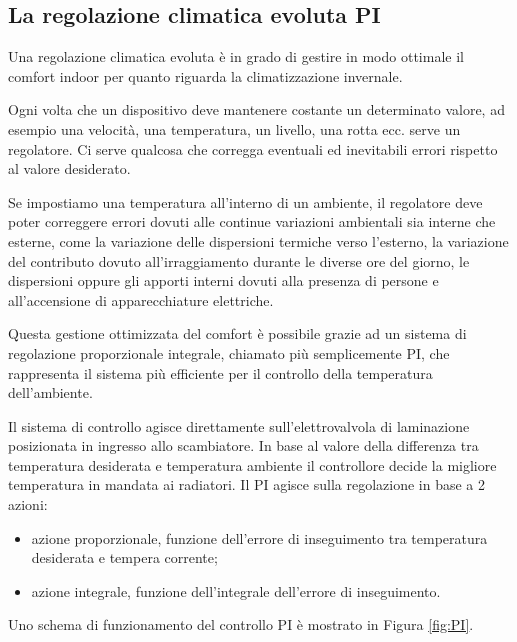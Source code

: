 \documentclass[laurea,oneside,11pt]{USiena_tesiLM3}
\begin{document}
\subsection{La regolazione climatica evoluta PI}
Una regolazione climatica evoluta è in grado di gestire in modo ottimale il comfort indoor per quanto riguarda la climatizzazione invernale.

Ogni volta che un dispositivo deve mantenere costante un determinato valore, ad esempio una velocità, una temperatura, un livello, una rotta ecc. serve un regolatore. Ci serve qualcosa che corregga eventuali ed inevitabili errori rispetto al valore desiderato.
 
Se impostiamo una temperatura all'interno di un ambiente, il regolatore deve poter correggere errori dovuti alle continue variazioni ambientali sia interne che esterne, come la variazione delle dispersioni termiche verso l'esterno, la variazione del contributo dovuto all'irraggiamento durante le diverse ore del giorno, le dispersioni oppure gli apporti interni dovuti alla presenza di persone e all'accensione di apparecchiature elettriche.

Questa gestione ottimizzata  del comfort è possibile grazie ad un sistema di regolazione proporzionale integrale, chiamato più semplicemente PI, che rappresenta il sistema più efficiente per il controllo della temperatura dell'ambiente. 

Il sistema di controllo agisce direttamente sull'elettrovalvola di laminazione posizionata in ingresso allo scambiatore. In base al valore della differenza tra temperatura desiderata e temperatura ambiente il controllore decide la migliore temperatura in mandata ai radiatori. Il PI agisce sulla regolazione in base a 2 azioni:
\begin{itemize}
\item azione proporzionale, funzione dell'errore di inseguimento tra temperatura desiderata e tempera corrente;
\item  azione integrale, funzione dell'integrale dell'errore di inseguimento.
\end{itemize}
Uno schema di funzionamento del controllo PI è mostrato in Figura \ref{fig:PI}.
\end{document}

